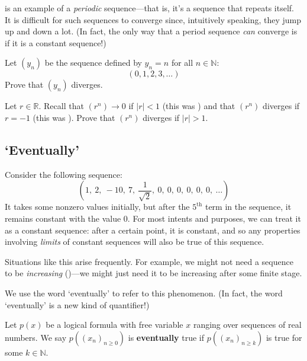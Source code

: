  is an example of a \textit{periodic} sequence---that is, it's a sequence that repeats itself. It is difficult for such sequences to converge since, intuitively speaking, they jump up and down a lot. (In fact, the only way that a period sequence \textit{can} converge is if it is a constant sequence!)

\begin{exercise}
Let $(y_n)$ be the sequence defined by $y_n=n$ for all $n \in \mathbb{N}$:
\[ (0,1,2,3,\dots) \]
Prove that $(y_n)$ diverges.
\end{exercise}

\begin{exercise}
Let $r \in \mathbb{R}$. Recall that $(r^n) \to 0$ if $|r|<1$ (this was ) and that $(r^n)$ diverges if $r=-1$ (this was ). Prove that $(r^n)$ diverges if $|r|>1$.
\end{exercise}

\subsection*{`Eventually'}

Consider the following sequence:
\[ \left( 1,~ 2,~ -10,~ 7,~ \frac{1}{\sqrt{2}},~ 0,~ 0,~ 0,~ 0,~ 0,~ 0,~ \dots \right) \]
It takes some nonzero values initially, but after the $5^{\text{th}}$ term in the sequence, it remains constant with the value $0$. For most intents and purposes, we can treat it as a constant sequence: after a certain point, it is constant, and so any properties involving \textit{limits} of constant sequences will also be true of this sequence.

Situations like this arise frequently. For example, we might not need a sequence to be \textit{increasing} ()---we might just need it to be increasing after some finite stage.

We use the word `eventually' to refer to this phenomenon. (In fact, the word `eventually' is a new kind of quantifier!)

\begin{definition}
\label{defEventually}
Let $p(x)$ be a logical formula with free variable $x$ ranging over sequences of real numbers. We say $p((x_n)_{n \ge 0})$ is \textbf{eventually} true if $p((x_n)_{n \ge k})$ is true for some $k \in \mathbb{N}$.
\end{definition}

